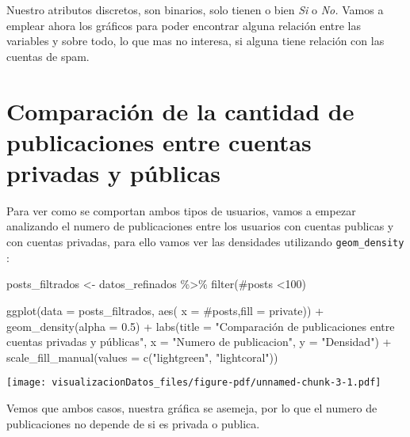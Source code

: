 \documentclass[
  letterpaper,
  DIV=11,
  numbers=noendperiod]{scrreprt}
\newenvironment{Shaded}{\begin{snugshade}}{\end{snugshade}}
\newcommand{\AttributeTok}[1]{\textcolor[rgb]{0.40,0.45,0.13}{#1}}
\newcommand{\DecValTok}[1]{\textcolor[rgb]{0.68,0.00,0.00}{#1}}
\newcommand{\FloatTok}[1]{\textcolor[rgb]{0.68,0.00,0.00}{#1}}
\newcommand{\FunctionTok}[1]{\textcolor[rgb]{0.28,0.35,0.67}{#1}}
\newcommand{\NormalTok}[1]{\textcolor[rgb]{0.00,0.23,0.31}{#1}}
\newcommand{\OtherTok}[1]{\textcolor[rgb]{0.00,0.23,0.31}{#1}}
\newcommand{\SpecialCharTok}[1]{\textcolor[rgb]{0.37,0.37,0.37}{#1}}
\newcommand{\StringTok}[1]{\textcolor[rgb]{0.13,0.47,0.30}{#1}}
\begin{document}
Nuestro atributos discretos, son binarios, solo tienen o bien \emph{Si}
o \emph{No.} Vamos a emplear ahora los gráficos para poder encontrar
alguna relación entre las variables y sobre todo, lo que mas no
interesa, si alguna tiene relación con las cuentas de spam.

\section{Comparación de la cantidad de publicaciones entre cuentas
privadas y
públicas}\label{comparaciuxf3n-de-la-cantidad-de-publicaciones-entre-cuentas-privadas-y-puxfablicas}

Para ver como se comportan ambos tipos de usuarios, vamos a empezar
analizando el numero de publicaciones entre los usuarios con cuentas
publicas y con cuentas privadas, para ello vamos ver las densidades
utilizando \texttt{geom\_density} :

\begin{Shaded}
\begin{Highlighting}[]
\NormalTok{posts\_filtrados }\OtherTok{\textless{}{-}}\NormalTok{ datos\_refinados }\SpecialCharTok{\%\textgreater{}\%}  \FunctionTok{filter}\NormalTok{(}\StringTok{\textasciigrave{}}\AttributeTok{\#posts}\StringTok{\textasciigrave{}} \SpecialCharTok{\textless{}}\DecValTok{100}\NormalTok{)}

\FunctionTok{ggplot}\NormalTok{(}\AttributeTok{data =}\NormalTok{ posts\_filtrados, }\FunctionTok{aes}\NormalTok{( }\AttributeTok{x =} \StringTok{\textasciigrave{}}\AttributeTok{\#posts}\StringTok{\textasciigrave{}}\NormalTok{,}\AttributeTok{fill =}\NormalTok{ private)) }\SpecialCharTok{+}
  \FunctionTok{geom\_density}\NormalTok{(}\AttributeTok{alpha =} \FloatTok{0.5}\NormalTok{) }\SpecialCharTok{+}
  \FunctionTok{labs}\NormalTok{(}\AttributeTok{title =} \StringTok{"Comparación de publicaciones entre cuentas privadas y públicas"}\NormalTok{,}
       \AttributeTok{x =} \StringTok{"Numero de publicacion"}\NormalTok{,}
       \AttributeTok{y =} \StringTok{"Densidad"}\NormalTok{) }\SpecialCharTok{+}
  \FunctionTok{scale\_fill\_manual}\NormalTok{(}\AttributeTok{values =} \FunctionTok{c}\NormalTok{(}\StringTok{"lightgreen"}\NormalTok{, }\StringTok{"lightcoral"}\NormalTok{))}
\end{Highlighting}
\end{Shaded}

\texttt{[image: visualizacionDatos\_files/figure-pdf/unnamed-chunk-3-1.pdf]}

Vemos que ambos casos, nuestra gráfica se asemeja, por lo que el numero
de publicaciones no depende de si es privada o publica.
\end{document}
